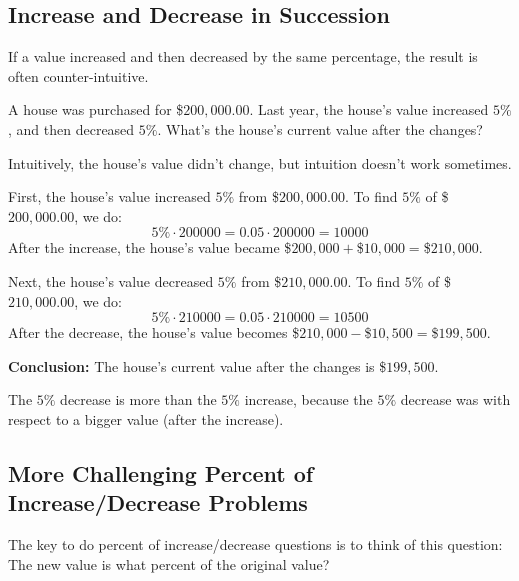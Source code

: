 \subsection{Increase and Decrease in Succession}
If a value increased and then decreased by the same percentage, the result is often counter-intuitive.

\begin{myexample}
A house was purchased for \$$200,000.00$. Last year, the house's value increased $5\%$, and then decreased $5\%$. What's the house's current value after the changes?
\end{myexample}
\begin{solution}
Intuitively, the house's value didn't change, but intuition doesn't work sometimes.

First, the house's value increased $5\%$ from \$$200,000.00$. To find $5\%$ of \$$200,000.00$, we do:
\[ 5\% \cdot 200000 = 0.05 \cdot 200000 = 10000 \]
After the increase, the house's value became \$$200,000+$\$$10,000=$\$$210,000$.

Next, the house's value decreased $5\%$ from \$$210,000.00$. To find $5\%$ of \$$210,000.00$, we do:
\[ 5\% \cdot 210000 = 0.05 \cdot 210000 = 10500 \]
After the decrease, the house's value becomes \$$210,000-$\$$10,500=$\$$199,500$.

\textbf{Conclusion:} The house's current value after the changes is \$$199,500$.

The $5\%$ decrease is more than the $5\%$ increase, because the $5\%$ decrease was with respect to a bigger value (after the increase).
\end{solution}

\subsection{More Challenging Percent of Increase/Decrease Problems}
The key to do percent of increase/decrease questions is to think of this question: The new value is what percent of the original value?

